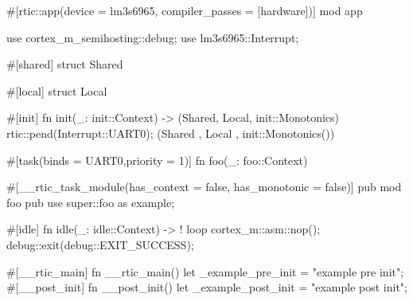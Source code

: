 #[rtic::app(device = lm3s6965, compiler_passes = [hardware])]
mod app {
    use cortex_m_semihosting::debug;
    use lm3s6965::Interrupt;

    #[shared]
    struct Shared {}

    #[local]
    struct Local {}

    #[init]
    fn init(_: init::Context) -> (Shared, Local, init::Monotonics) {
        rtic::pend(Interrupt::UART0);
        (Shared {}, Local {}, init::Monotonics())
    }

    #[task(binds = UART0,priority = 1)]
    fn foo(_: foo::Context) {
    }

    #[__rtic_task_module(has_context = false, has_monotonic = false)]
    pub mod foo {
        pub use super::foo as example;
    }

    #[idle]
    fn idle(_: idle::Context) -> ! {
        loop {
            cortex_m::asm::nop();
            debug::exit(debug::EXIT_SUCCESS);
        }
    }

    #[__rtic_main]
    fn __rtic_main(){
        let _example_pre_init = "example pre init";
        #[__post_init]
        fn __post_init() {
            let _example_post_init = "example post init";
        }
    }
}

